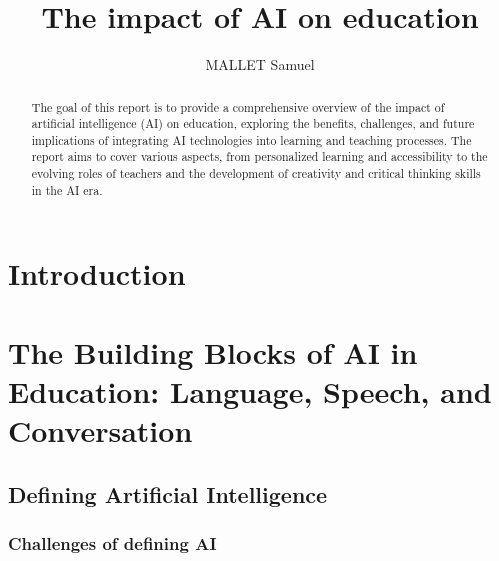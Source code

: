 \documentclass{article}
\title{The impact of AI on education}
\author{MALLET Samuel}
\begin{document}
\maketitle

\begin{abstract}
    The goal of this report is to provide a comprehensive
    overview of the impact of artificial intelligence (AI)
    on education, exploring the benefits, challenges, and
    future implications of integrating AI technologies into
    learning and teaching processes. The report aims to cover
    various aspects, from personalized learning and
    accessibility to the evolving roles of teachers and the
    development of creativity and critical thinking skills
    in the AI era.
\end{abstract}

\newpage

\tableofcontents

\section{Introduction}

\section{The Building Blocks of AI in Education: Language, Speech, and Conversation}
\subsection{Defining Artificial Intelligence}

\subsubsection{Challenges of defining AI}
\end{document}
